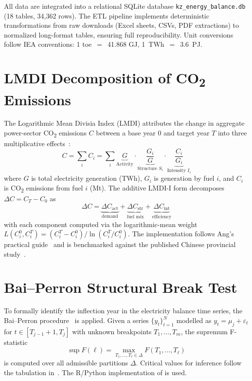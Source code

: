 All data are integrated into a relational SQLite database \texttt{kz\_energy\_\allowbreak balance.db} (18 tables, 34{,}362 rows). The ETL pipeline implements deterministic transformations from raw downloads (Excel sheets, CSVs, PDF extractions) to normalized long-format tables, ensuring full reproducibility. Unit conversions follow IEA conventions: 1 toe~$=$~41.868 GJ, 1~TWh~$=$~3.6~PJ.

\section{LMDI Decomposition of CO\textsubscript{2} Emissions}
\label{sec:method_lmdi}

The Logarithmic Mean Divisia Index (LMDI) attributes the change in aggregate power-sector CO\textsubscript{2} emissions $C$ between a base year $0$ and target year $T$ into three multiplicative effects~\cite{ang2005, ang2015}:
\begin{equation}
    C = \sum_{i} C_i = \sum_{i} \underbrace{G}_{\text{Activity}} \cdot \underbrace{\frac{G_i}{G}}_{\text{Structure } S_i} \cdot \underbrace{\frac{C_i}{G_i}}_{\text{Intensity } I_i}
\end{equation}
where $G$ is total electricity generation (TWh), $G_i$ is generation by fuel $i$, and $C_i$ is CO\textsubscript{2} emissions from fuel $i$ (Mt). The additive LMDI-I form decomposes $\Delta C = C_T - C_0$ as
\begin{equation}
    \Delta C = \underbrace{\Delta C_{\text{act}}}_{\text{demand}} + \underbrace{\Delta C_{\text{str}}}_{\text{fuel mix}} + \underbrace{\Delta C_{\text{int}}}_{\text{efficiency}}
\end{equation}
with each component computed via the logarithmic-mean weight $L(C_i^0, C_i^T) = (C_i^T - C_i^0)/\ln(C_i^T/C_i^0)$. The implementation follows Ang's practical guide~\cite{ang2015} and is benchmarked against the published Chinese provincial study~\cite{liu2020}.

\section{Bai--Perron Structural Break Test}
\label{sec:method_breakpoint}

To formally identify the inflection year in the electricity balance time series, the Bai--Perron procedure~\cite{baiperron1998, baiperron2003} is applied. Given a series $\{y_t\}_{t=1}^{N}$ modelled as $y_t = \mu_j + \varepsilon_t$ for $t \in [T_{j-1}+1, T_j]$ with unknown breakpoints $T_1, \ldots, T_m$, the supremum F-statistic
\begin{equation}
    \sup F(\ell) = \max_{T_1, \ldots, T_\ell \in \Delta} F(T_1, \ldots, T_\ell)
\end{equation}
is computed over all admissible partitions $\Delta$. Critical values for inference follow the tabulation in~\cite{baiperron2003}. The R/Python implementation of \cite{zeileis2003} is used.

